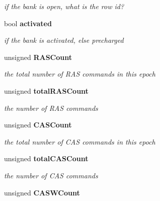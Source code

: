 \begin{CompactItemize}
\begin{CompactList}\small\item\em if the bank is open, what is the row id? \item\end{CompactList}\item 
bool {\bf activated}\label{class_d_r_a_msim_i_i_1_1_bank_3446e366c59cb3e21c6d411a612750ba}

\begin{CompactList}\small\item\em if the bank is activated, else precharged \item\end{CompactList}\item 
unsigned {\bf RASCount}\label{class_d_r_a_msim_i_i_1_1_bank_338a21bc0828ef57cd2d9d4aa7c0ae90}

\begin{CompactList}\small\item\em the total number of RAS commands in this epoch \item\end{CompactList}\item 
unsigned {\bf totalRASCount}\label{class_d_r_a_msim_i_i_1_1_bank_a90b366a2a825ccf900f92f61ad212ea}

\begin{CompactList}\small\item\em the number of RAS commands \item\end{CompactList}\item 
unsigned {\bf CASCount}\label{class_d_r_a_msim_i_i_1_1_bank_9e2f81ec167624aa605ebc364d4e1fc2}

\begin{CompactList}\small\item\em the total number of CAS commands in this epoch \item\end{CompactList}\item 
unsigned {\bf totalCASCount}\label{class_d_r_a_msim_i_i_1_1_bank_17aa509630e5e07577b48763bb2106c3}

\begin{CompactList}\small\item\em the number of CAS commands \item\end{CompactList}\item 
unsigned {\bf CASWCount}\label{class_d_r_a_msim_i_i_1_1_bank_55f29a529b11815fceb24a8f3649360a}


\end{CompactItemize}

